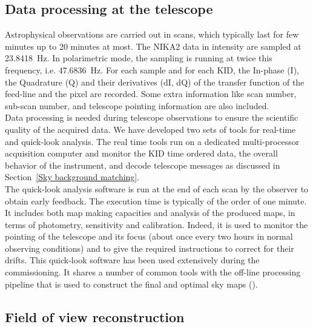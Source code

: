 \documentclass[]{aa} %
\begin{document}
\subsection{Data processing at the telescope}
\label{Data processing at the telescope}

Astrophysical observations are carried out in scans, which typically last for few minutes up to 20 minutes at most.
The NIKA2 data in intensity are sampled at 23.8418~Hz. In polarimetric mode, the sampling is running at twice this frequency, i.e. 47.6836~Hz. For each sample and for each KID, the In-phase (I), the Quadrature (Q) and their derivatives (dI, dQ) of the transfer function of the feed-line and the pixel are recorded. Some extra information like scan number, sub-scan number, and telescope pointing information are also included. \\

Data processing is needed during telescope observations to ensure the scientific quality of the acquired data.
We have developed two sets of tools for real-time and quick-look analysis. The real time tools run on a dedicated multi-processor acquisition computer and monitor the KID time ordered data, the overall behavior of the instrument, and decode telescope messages as discussed in Section~\ref{Sky background matching}. \\

The quick-look analysis software is run at the end of each scan by the observer to obtain early feedback. The execution time is typically of the order of one minute. It includes both map making capacities and analysis of the produced maps, in terms of photometry, sensitivity and calibration. Indeed, it is used to monitor the pointing of the telescope and its focus (about once every two hours in normal observing conditions) and to give the required instructions to correct for their drifts. This quick-look software has been used extensively during the commissioning. It shares a number of common tools with the off-line processing pipeline that is used to construct the final and optimal sky maps (\cite{pipeline}).

\subsection{Field of view reconstruction}
\label{Field of view reconstruction}
\end{document}
